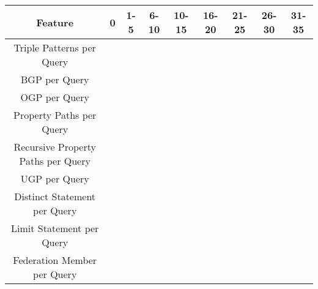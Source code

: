\begin{center}
    \begin{tabular}{|*{9}{c|}}
     \hline
     Feature & 0 & 1-5 & 6-10 & 10-15 & 16-20 & 21-25 & 26-30 & 31-35 \\ 
     \hline \hline
     Triple Patterns per Query & {} & {} & {} & {} & {} & {} & {} & {} \\ 
     \hline
     BGP per Query & {} & {} & {} & {} & {} & {} & {} & {} \\ 
     \hline
     OGP per Query & {} & {} & {} & {} & {} & {} & {} & {} \\ 
     \hline
     Property Paths per Query & {} & {} & {} & {} & {} & {} & {} & {} \\ 
     \hline
     Recursive Property Paths per Query & {} & {} & {} & {} & {} & {} & {} & {} \\ 
     \hline
     UGP per Query & {} & {} & {} & {} & {} & {} & {} & {} \\ 
     \hline
     Distinct Statement per Query & {} & {} & {} & {} & {} & {} & {} & {} \\ 
     \hline
     Limit Statement per Query & {} & {} & {} & {} & {} & {} & {} & {} \\  
     \hline
     Federation Member per Query & {} & {} & {} & {} & {} & {} & {} & {} \\  
     \hline
    \end{tabular}
\end{center}